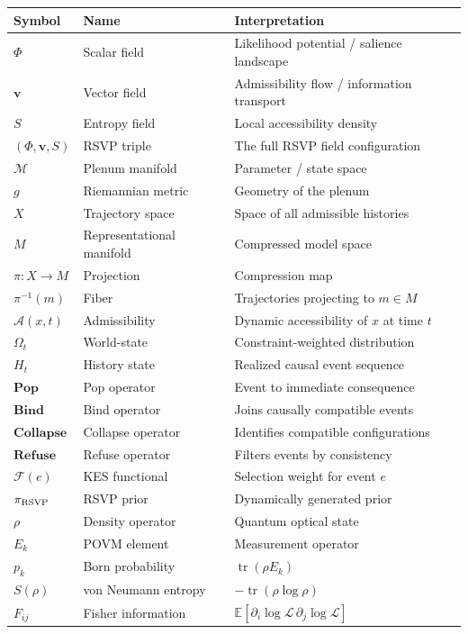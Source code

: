 \documentclass[11pt, openright, twoside]{book}
\theoremstyle{plain}
\theoremstyle{definition}
\theoremstyle{remark}
\newcommand{\vfield}{\mathbf{v}}
\newcommand{\Sfield}{S}
\newcommand{\rsvp}{(\Phi,\vfield,\Sfield)}
\newcommand{\Pop}{\mathbf{Pop}}
\newcommand{\Bind}{\mathbf{Bind}}
\newcommand{\Collapse}{\mathbf{Collapse}}
\newcommand{\Refuse}{\mathbf{Refuse}}
\newcommand{\Admiss}{\mathcal{A}}
\newcommand{\Traj}{X}
\newcommand{\Rep}{M}
\newcommand{\proj}{\pi}
\begin{document}
\begin{longtable}{@{}lll@{}}
\toprule
\textbf{Symbol} & \textbf{Name} & \textbf{Interpretation} \\
\midrule\endhead
$\Phi$ & Scalar field & Likelihood potential / salience landscape \\
$\vfield$ & Vector field & Admissibility flow / information transport \\
$\Sfield$ & Entropy field & Local accessibility density \\
$\rsvp$ & RSVP triple & The full RSVP field configuration \\
$\mathcal{M}$ & Plenum manifold & Parameter / state space \\
$g$ & Riemannian metric & Geometry of the plenum \\
$\Traj$ & Trajectory space & Space of all admissible histories \\
$\Rep$ & Representational manifold & Compressed model space \\
$\proj:\Traj\to\Rep$ & Projection & Compression map \\
$\proj^{-1}(m)$ & Fiber & Trajectories projecting to $m\in\Rep$ \\
$\Admiss(x,t)$ & Admissibility & Dynamic accessibility of $x$ at time $t$ \\
$\Omega_t$ & World-state & Constraint-weighted distribution \\
$H_t$ & History state & Realized causal event sequence \\
$\Pop$ & Pop operator & Event to immediate consequence \\
$\Bind$ & Bind operator & Joins causally compatible events \\
$\Collapse$ & Collapse operator & Identifies compatible configurations \\
$\Refuse$ & Refuse operator & Filters events by consistency \\
$\mathcal{F}(e)$ & KES functional & Selection weight for event $e$ \\
$\pi_{\rm RSVP}$ & RSVP prior & Dynamically generated prior \\
$\rho$ & Density operator & Quantum optical state \\
$E_k$ & POVM element & Measurement operator \\
$p_k$ & Born probability & $\operatorname{tr}(\rho E_k)$ \\
$S(\rho)$ & von Neumann entropy & $-\operatorname{tr}(\rho\log\rho)$ \\
$F_{ij}$ & Fisher information & $\mathbb{E}[\partial_i\log\mathcal{L}\,\partial_j\log\mathcal{L}]$ \\

\end{longtable}
\end{document}
